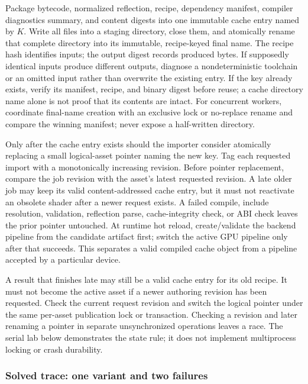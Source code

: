 \hypertarget{05-engine-i-ch010-publish-only-a-complete-successful-result}{}

Package bytecode, normalized reflection, recipe, dependency manifest, compiler diagnostics summary, and content digests into one immutable cache entry named by \(K\). Write all files into a staging directory, close them, and atomically rename that complete directory into its immutable, recipe-keyed final name. The recipe hash identifies inputs; the output digest records produced bytes. If supposedly identical inputs produce different outputs, diagnose a nondeterministic toolchain or an omitted input rather than overwrite the existing entry. If the key already exists, verify its manifest, recipe, and binary digest before reuse; a cache directory name alone is not proof that its contents are intact. For concurrent workers, coordinate final-name creation with an exclusive lock or no-replace rename and compare the winning manifest; never expose a half-written directory.

Only after the cache entry exists should the importer consider atomically replacing a small logical-asset pointer naming the new key. Tag each requested import with a monotonically increasing revision. Before pointer replacement, compare the job revision with the asset's latest requested revision. A late older job may keep its valid content-addressed cache entry, but it must not reactivate an obsolete shader after a newer request exists. A failed compile, include resolution, validation, reflection parse, cache-integrity check, or ABI check leaves the prior pointer untouched. At runtime hot reload, create/validate the backend pipeline from the candidate artifact first; switch the active GPU pipeline only after that succeeds. This separates a valid compiled cache object from a pipeline accepted by a particular device.

A result that finishes late may still be a valid cache entry for its old recipe. It must not become the active asset if a newer authoring revision has been requested. Check the current request revision and switch the logical pointer under the same per-asset publication lock or transaction. Checking a revision and later renaming a pointer in separate unsynchronized operations leaves a race. The serial lab below demonstrates the state rule; it does not implement multiprocess locking or crash durability.

\subsubsection{Solved trace: one variant and two failures}\label{05-engine-i-ch010-solved-trace-one-variant-and-two-failures}

